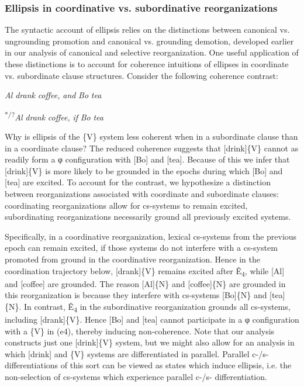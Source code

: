\subsubsection{Ellipsis in coordinative vs. subordinative reorganizations}

The syntactic account of ellipsis relies on the distinctions between canonical vs. ungrounding promotion and canonical vs. grounding demotion, developed earlier in our analysis of canonical and selective reorganization. One useful application of these distinctions is to account for coherence intuitions of ellipses in coordinate vs. subordinate clause structures. Consider the following coherence contrast:

    \textit{Al} \textit{drank} \textit{coffee,} \textit{and} \textit{Bo} \textit{tea}

    \textsuperscript{*/?}\textit{Al} \textit{drank} \textit{coffee,} \textit{if} \textit{Bo} \textit{tea}

  Why is ellipsis of the \{V\} system less coherent when in a subordinate clause than in a coordinate clause? The reduced coherence suggests that [drink]\{V\} cannot as readily form a φ configuration with [Bo] and [tea]. Because of this we infer that [drink]\{V\} is more likely to be grounded in the epochs during which [Bo] and [tea] are excited. To account for the contrast, we hypothesize a distinction between reorganizations associated with coordinate and subordinate clauses: coordinating reorganizations allow for cs-systems to remain excited, subordinating reorganizations necessarily ground all previously excited systems. 

  Specifically, in a coordinative reorganization, lexical cs-systems from the previous epoch can remain excited, if those systems do not interfere with a cs-system promoted from ground in the coordinative reorganization. Hence in the coordination trajectory below, [drank]\{V\} remains excited after Ê\textsubscript{4}, while [Al] and [coffee] are grounded. The reason [Al]\{N\} and [coffee]\{N\} are grounded in this reorganization is because they interfere with cs-systems [Bo]\{N\} and [tea]\{N\}. In contrast, Ê\textsubscript{4} in the subordinative reorganization grounds all cs-systems, including [drank]\{V\}. Hence [Bo] and [tea] cannot participate in a φ configuration with a \{V\} in (e4), thereby inducing non-coherence. Note that our analysis constructs just one [drink]\{V\} system, but we might also allow for an analysis in which [drink] and \{V\} systems are differentiated in parallel. Parallel c-/s- differentiations of this sort can be viewed as states which induce ellipsis, i.e. the non-selection of cs-systems which experience parallel c-/s- differentiation.

